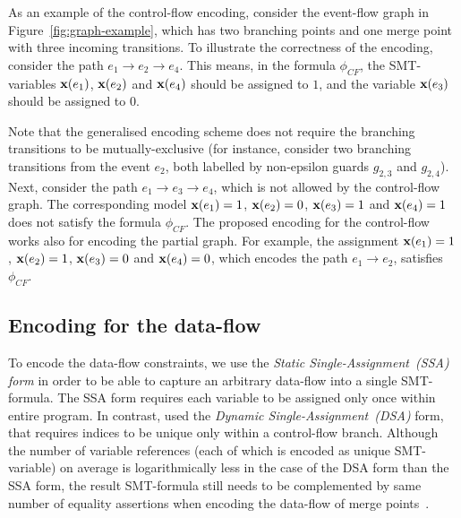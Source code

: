 As an example of the control-flow encoding, consider the event-flow graph in Figure~\ref{fig:graph-example}, which has two branching points and one merge point with three incoming transitions.
To illustrate the correctness of the encoding, consider the path $e_1 \rightarrow e_2 \rightarrow e_4$.
This means, in the formula $\phi_{CF}$, the SMT-variables $\mathbf{x}(e_1)$, $\mathbf{x}(e_2)$ and $\mathbf{x}(e_4)$ should be assigned to  $1$, and the variable $\mathbf{x}(e_3)$ should be assigned to $0$.

Note that the generalised encoding scheme does not require the branching transitions to be mutually-exclusive (for instance, consider two branching transitions from the event $e_2$, both labelled by non-epsilon guards $g_{2,3}$ and $g_{2,4}$).
Next, consider the path $e_1 \rightarrow e_3 \rightarrow e_4$, which is not allowed by the control-flow graph.
The corresponding model $\mathbf{x}(e_1)=1$, $\mathbf{x}(e_2)=0$, $\mathbf{x}(e_3)=1$ and $\mathbf{x}(e_4)=1$ does not satisfy the formula $\phi_{CF}$.
The proposed encoding for the control-flow works also for encoding the partial graph.
For example, the assignment $\mathbf{x}(e_1)=1$, $\mathbf{x}(e_2)=1$, $\mathbf{x}(e_3)=0$ and $\mathbf{x}(e_4)=0$, which encodes the path $e_1 \rightarrow e_2$, satisfies $\phi_{CF}$.

\subsection{Encoding for the data-flow}
\label{ch:enc:bmc:df}

To encode the data-flow constraints, we use the \textit{Static Single-Assignment~(SSA) form} in order to be able to capture an arbitrary data-flow into a single SMT-formula.
The SSA form requires each variable to be assigned only once within entire program.
In contrast, \porthos{} used the \textit{Dynamic Single-Assignment~(DSA)} form, that requires indices to be unique only within a control-flow branch.
Although the number of variable references (each of which is encoded as unique SMT-variable) on average is logarithmically less in the case of the DSA form than the SSA form, the result SMT-formula still needs to be complemented by same number of equality assertions when encoding the data-flow of merge points~\cite{Porthos17a}.

